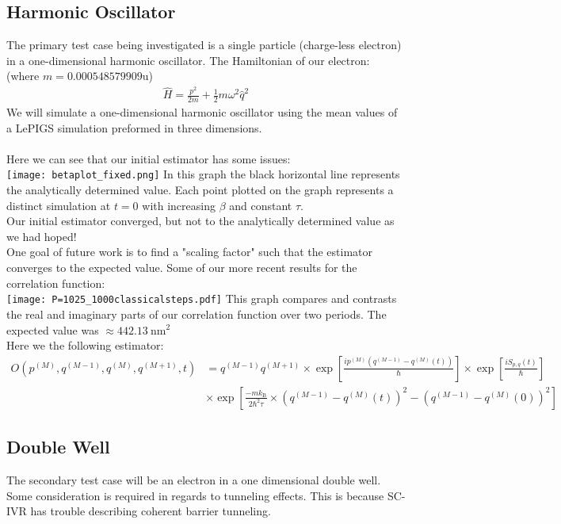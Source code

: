 \documentclass[12pt,letterpaper,oneside,final,titlepage]{article}               %
\numberwithin{equation}{section} %
\newcommand{\expb}[1]{\ensuremath{\exp{\left[ #1 \right]}}}
\begin{document}
\subsection*{Harmonic Oscillator}
The primary test case being investigated is a single particle (charge-less electron) in a one-dimensional harmonic oscillator. 
The Hamiltonian of our electron: (where $m = \num{0.000548579909}$u)
\begin{align}
    \hat{H} = \frac{p^2}{2m} + \frac{1}{2} m \omega^{2} \hat{q}^{2} 
\end{align}
We will simulate a one-dimensional harmonic oscillator using the mean values of a LePIGS simulation preformed in three dimensions. \\ \\
Here we can see that our initial estimator has some issues:\\
\texttt{[image: betaplot\_fixed.png]}
In this graph the black horizontal line represents the analytically determined value.
Each point plotted on the graph represents a distinct simulation at $t=0$ with increasing $\beta$ and constant $\tau$.\\
Our initial estimator converged, but not to the analytically determined value as we had hoped! \\
One goal of future work is to find a "scaling factor" such that the estimator converges to the expected value.
Some of our more recent results for the correlation function:\\
\texttt{[image: P=1025\_1000classicalsteps.pdf]}
This graph compares and contrasts the real and imaginary parts of our correlation function over two periods. 
The expected value was $\approx 442.13~\textrm{nm}^2$ \\
Here we the following estimator:
\newcommand{\bead}[1]{^{(#1)}}
\newcommand{\kB}{k_\textrm{B}}
\begin{align*}
    O(p\bead{M}, q\bead{M-1}, q\bead{M}, q\bead{M+1}, t) 
        &= q\bead{M-1} q\bead{M+1}
        \times\expb{\frac{ip\bead{M}(q\bead{M-1} - q\bead{M}(t))}{\hbar}} 
        \times\expb{\frac{iS_{p,q}(t)}{\hbar}}
    \\  &\times\expb{\frac{-m\kB}{2\hbar^{2}\tau} \times(q\bead{M-1} - q\bead{M}(t))^{2} - (q\bead{M-1} - q\bead{M}(0))^{2}}
\end{align*} 

\subsection*{Double Well}
The secondary test case will be an electron in a one dimensional double well. 
Some consideration is required in regards to tunneling effects. 
This is because SC-IVR has trouble describing coherent barrier tunneling.
\end{document}
